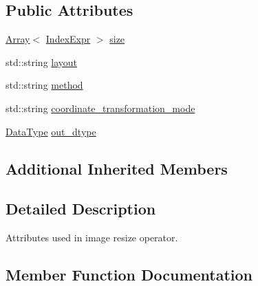 \subsection*{Public Attributes}
\begin{DoxyCompactItemize}
\item 
\hyperlink{classtvm_1_1Array}{Array}$<$ \hyperlink{namespacetvm_1_1relay_ae153a27d81399fd266b8d598227764c4}{Index\+Expr} $>$ \hyperlink{structtvm_1_1relay_1_1ResizeAttrs_aef3ecbf87f57550f42f4a92f6a80b5c8}{size}
\item 
std\+::string \hyperlink{structtvm_1_1relay_1_1ResizeAttrs_a8811bf763240830ce3e3dff32cd74163}{layout}
\item 
std\+::string \hyperlink{structtvm_1_1relay_1_1ResizeAttrs_a45a5182646e979ac0d4f1f181005e7d6}{method}
\item 
std\+::string \hyperlink{structtvm_1_1relay_1_1ResizeAttrs_a7cd2df8ffbfa45167479cd390489d6bc}{coordinate\+\_\+transformation\+\_\+mode}
\item 
\hyperlink{namespacetvm_a41918af1a1dc386388639a9d3ad06c5d}{Data\+Type} \hyperlink{structtvm_1_1relay_1_1ResizeAttrs_ab1c2f6194ad51429a976105bcbeeef17}{out\+\_\+dtype}
\end{DoxyCompactItemize}
\subsection*{Additional Inherited Members}


\subsection{Detailed Description}
Attributes used in image resize operator. 

\subsection{Member Function Documentation}
